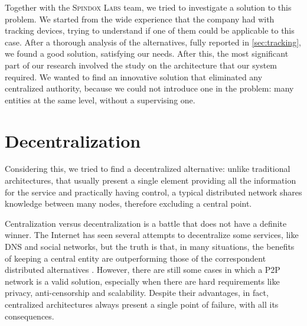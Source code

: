 Together with the \textsc{Spindox Labs} team, we tried to investigate a solution to this problem. We started from the wide experience that the company had with tracking devices, trying to understand if one of them could be applicable to this case. After a thorough analysis of the alternatives, fully reported in \ref{sec:tracking}, we found a good solution, satisfying our needs. After this, the most significant part of our research involved the study on the architecture that our system required. We wanted to find an innovative solution that eliminated any centralized authority, because we could not introduce one in the problem: many entities at the same level, without a supervising one. 

\section{Decentralization}
\label{sec:decentralization}

Considering this, we tried to find a decentralized alternative: unlike traditional architectures, that usually present a single element providing all the information for the service and practically having control, a typical distributed network shares knowledge between many nodes, therefore excluding a central point.

Centralization versus decentralization is a battle that does not have a definite winner. The Internet has seen several attempts to decentralize some services, like DNS and social networks, but the truth is that, in many situations, the benefits of keeping a central entity are outperforming those of the correspondent distributed alternatives \cite{Montresor_Permissionless}. However, there are still some cases in which a P2P network is a valid solution, especially when there are hard requirements like privacy, anti-censorship and scalability. Despite their advantages, in fact, centralized architectures always present a single point of failure, with all its consequences.

